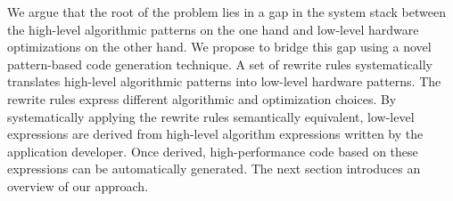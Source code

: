 \clearpage

We argue that the root of the problem lies in a gap in the system stack between the high-level algorithmic patterns on the one hand and low-level hardware optimizations on the other hand.
We propose to bridge this gap using a novel pattern-based code generation technique.
A set of rewrite rules systematically translates high-level algorithmic patterns into low-level hardware patterns.
The rewrite rules express different algorithmic and optimization choices.
By systematically applying the rewrite rules semantically equivalent, low-level expressions are derived from high-level algorithm expressions written by the application developer.
Once derived, high-performance code based on these expressions can be automatically generated.
The next section introduces an overview of our approach.

